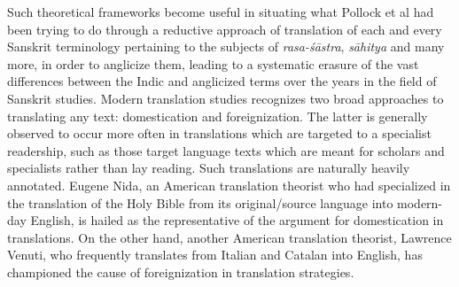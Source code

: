 Such theoretical frameworks become useful in situating what Pollock et al had been trying to do through a reductive approach of translation of each and every Sanskrit terminology pertaining to the subjects of \textsl{rasa-śāstra}, \textsl{sāhitya} and many more, in order to anglicize them, leading to a systematic erasure of the vast differences between the Indic and anglicized terms over the years in the field of Sanskrit studies. Modern translation studies recognizes two broad approaches to translating any text: domestication and foreignization. The latter is generally observed to occur more often in translations which are targeted to a specialist readership, such as those target language texts which are meant for scholars and specialists rather than lay reading. Such translations are naturally heavily annotated. Eugene Nida, an American translation theorist who had specialized in the translation of the Holy Bible from its original/source language into modern-day English, is hailed as the representative of the argument for domestication in translations. On the other hand, another American translation theorist, Lawrence Venuti, who frequently translates from Italian and Catalan into English, has championed the cause of foreignization in translation strategies. 

